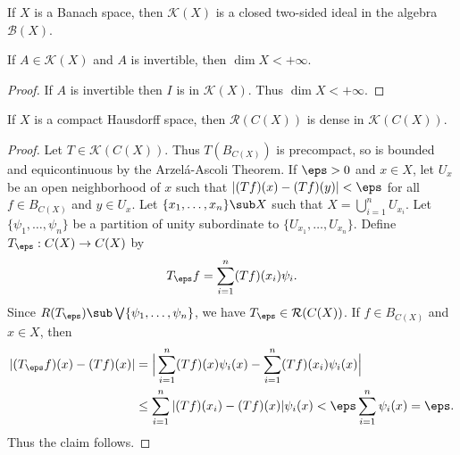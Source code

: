 \begin{corollary}
If $X$ is a Banach space, then $\mathcal{K}(X)$ is a closed two-sided ideal in the algebra $\mathcal{B}(X)$.
\end{corollary}
\begin{corollary}\label{Banach space compact operator invertible iff}
If $A\in\mathcal{K}(X)$ and $A$ is invertible, then $\dim X<+\infty$.
\end{corollary}
\begin{proof}
If $A$ is invertible then $I$ is in $\mathcal{K}(X)$. Thus $\dim X<+\infty$.
\end{proof}
\begin{theorem}
If $X$ is a compact Hausdorff space, then $\mathcal{R}(C(X))$ is dense in $\mathcal{K}(C(X))$.
\end{theorem}
\begin{proof}
Let $T\in\mathcal{K}(C(X))$. Thus $T(B_{C(X)})$ is precompact, so is bounded and equicontinuous by the Arzel\'a-Ascoli Theorem. If $\eps>0$ and $x\in X$, let $U_x$ be an open neighborhood of $x$ such that $|(Tf)(x)-(Tf)(y)|<\eps$ for all $f\in B_{C(X)}$ and $y\in U_x$. Let $\{x_1,\dots,x_n\}\sub X$ such that $X=\bigcup_{i=1}^{n}U_{x_i}$. Let $\{\psi_1,\dots,\psi_n\}$ be a partition of unity subordinate to $\{U_{x_1},\dots,U_{x_n}\}$. Define $T_\eps:C(X)\to C(X)$ by
\[T_\eps f=\sum_{i=1}^{n}(Tf)(x_i)\psi_i.\]
Since $R(T_\eps)\sub\bigvee\{\psi_1,\dots,\psi_n\}$, we have $T_\eps\in\mathcal{R}(C(X))$. If $f\in B_{C(X)}$ and $x\in X$, then
\begin{align*}
|(T_\eps f)(x)-(Tf)(x)|&=\Big|\sum_{i=1}^{n}(Tf)(x)\psi_i(x)-\sum_{i=1}^{n}(Tf)(x_i)\psi_i(x)\Big|\\
&\leq \sum_{i=1}^{n}|(Tf)(x_i)-(Tf)(x)|\psi_i(x)<\eps\sum_{i=1}^{n}\psi_i(x)=\eps.
\end{align*}
Thus the claim follows.
\end{proof}

